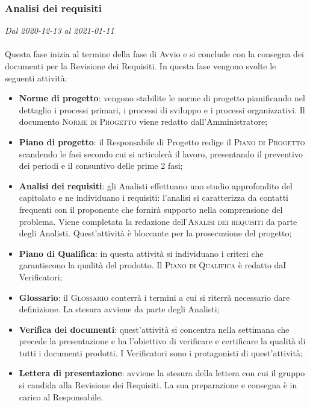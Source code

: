 \subsubsection{Analisi dei requisiti}

\textit{Dal 2020-12-13 al 2021-01-11}
\\\\
Questa fase inizia al termine della fase di Avvio e si conclude con la consegna dei documenti per la Revisione dei Requisiti.
In questa fase vengono svolte le seguenti attività:
\begin{itemize}
	\item \textbf{Norme di progetto}: vengono stabilite le norme di progetto pianificando nel dettaglio i processi primari, i processi di sviluppo e i processi organizzativi. Il documento \textsc{Norme di Progetto} viene redatto dall'Amministratore;
	\item \textbf{Piano di progetto}: il Responsabile di Progetto redige il \textsc{Piano di Progetto} scandendo le fasi secondo cui si articolerà il lavoro, presentando il preventivo dei periodi e il consuntivo delle prime 2 fasi;
	\item \textbf{Analisi dei requisiti}: gli Analisti effettuano uno studio approfondito del capitolato e ne individuano i requisiti: l'analisi si caratterizza da contatti frequenti con il proponente che fornirà supporto nella comprensione del problema. Viene completata la redazione dell'\textsc{Analisi dei requisiti} da parte degli Analisti. Quest'attività è bloccante per la prosecuzione del progetto;
	\item \textbf{Piano di Qualifica}: in questa attività si individuano i criteri che garantiscono la qualità del prodotto. Il \textsc{Piano di Qualifica} è redatto daI Verificatori;
	\item \textbf{Glossario}: il \textsc{Glossario} conterrà i termini a cui si riterrà necessario dare definizione. La stesura avviene da parte degli Analisti;
	\item \textbf{Verifica dei documenti}: quest'attività si concentra nella settimana che precede la presentazione e ha l'obiettivo di verificare e certificare la qualità di tutti i documenti prodotti. I Verificatori sono i protagonisti di quest'attività;
	\item \textbf{Lettera di presentazione}: avviene la stesura della lettera con cui il gruppo si candida alla Revisione dei Requisiti. La sua preparazione e consegna è in carico al Responsabile.
\end{itemize}

